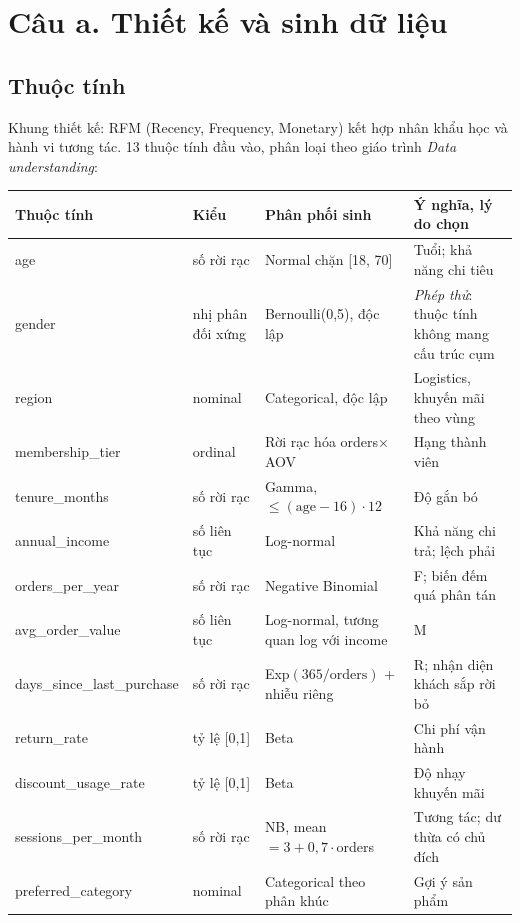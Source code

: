 \documentclass[12pt,a4paper]{article}
\begin{document}
\section{Câu a. Thiết kế và sinh dữ liệu}

\subsection{Thuộc tính}
Khung thiết kế: RFM (Recency, Frequency, Monetary) kết hợp nhân khẩu học và hành vi tương tác. 13 thuộc tính đầu vào, phân loại theo giáo trình \emph{Data understanding}:

\begin{table}[H]\centering\footnotesize
\begin{tabular}{@{}p{3.6cm}p{2.5cm}p{4.9cm}p{5.6cm}@{}}\toprule
Thuộc tính & Kiểu & Phân phối sinh & Ý nghĩa, lý do chọn\\\midrule
age & số rời rạc & Normal chặn [18, 70] & Tuổi; khả năng chi tiêu\\
gender & nhị phân đối xứng & Bernoulli(0,5), độc lập & \emph{Phép thử}: thuộc tính không mang cấu trúc cụm\\
region & nominal & Categorical, độc lập & Logistics, khuyến mãi theo vùng\\
membership\_tier & ordinal & Rời rạc hóa orders$\times$AOV & Hạng thành viên\\
tenure\_months & số rời rạc & Gamma, $\le (\text{age}-16)\cdot 12$ & Độ gắn bó\\
annual\_income & số liên tục & Log-normal & Khả năng chi trả; lệch phải\\
orders\_per\_year & số rời rạc & Negative Binomial & F; biến đếm quá phân tán\\
avg\_order\_value & số liên tục & Log-normal, tương quan log với income & M\\
days\_since\_last\_purchase & số rời rạc & Exp$(365/\text{orders})$ + nhiễu riêng & R; nhận diện khách sắp rời bỏ\\
return\_rate & tỷ lệ [0,1] & Beta & Chi phí vận hành\\
discount\_usage\_rate & tỷ lệ [0,1] & Beta & Độ nhạy khuyến mãi\\
sessions\_per\_month & số rời rạc & NB, mean $= 3 + 0{,}7\cdot$orders & Tương tác; dư thừa có chủ đích\\
preferred\_category & nominal & Categorical theo phân khúc & Gợi ý sản phẩm\\\bottomrule
\end{tabular}
\end{table}
\end{document}
